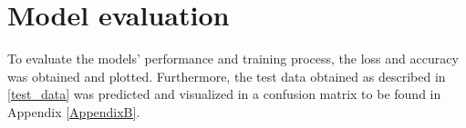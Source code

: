 


\section{Model evaluation}

To evaluate the models' performance and training process, the loss and accuracy was obtained and plotted. Furthermore, the test data obtained as described in \ref{test_data} was predicted and visualized in a confusion matrix to be found in Appendix \ref{AppendixB}.
